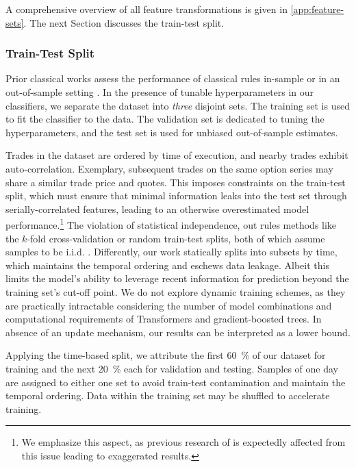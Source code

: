 A comprehensive overview of all feature transformations is given in \cref{app:feature-sets}. The next Section discusses the train-test split.

\subsubsection{Train-Test Split}\label{sec:train-test-split}

Prior classical works assess the performance of classical rules in-sample \autocite[cp.][541]{ellisAccuracyTradeClassification2000} or in an out-of-sample setting \autocites[cp.][7--9]{grauerOptionTradeClassification2022}[][3814--3815]{chakrabartyTradeClassificationAlgorithms2007}. In the presence of tunable hyperparameters in our classifiers, we separate the dataset into \emph{three} disjoint sets. The training set is used to fit the classifier to the data. The validation set is dedicated to tuning the hyperparameters, and the test set is used for unbiased out-of-sample estimates.

Trades in the dataset are ordered by time of execution, and nearby trades exhibit auto-correlation. Exemplary, subsequent trades on the same option series may share a similar trade price and quotes. This imposes constraints on the train-test split, which must ensure that minimal information leaks into the test set through serially-correlated features, leading to an otherwise overestimated model performance.\footnote{We emphasize this aspect, as previous research of \textcite[][14]{ronenMachineLearningTrade2022} is expectedly affected from this issue leading to exaggerated results.} The violation of statistical independence, out rules methods like the $k$-fold cross-validation or random train-test splits, both of which assume samples to be i.i.d. \autocite[][103--105]{lopezdepradoAdvancesFinancialMachine2018}. Differently, our work statically splits into subsets by time, which maintains the temporal ordering and eschews data leakage. Albeit this limits the model's ability to leverage recent information for prediction beyond the training set's cut-off point. We do not explore dynamic training schemes, as they are practically intractable considering the number of model combinations and computational requirements of Transformers and gradient-boosted trees. In absence of an update mechanism, our results can be interpreted as a lower bound.

Applying the time-based split, we attribute the first \SI{60}{\percent} of our dataset for training and the next \SI{20}{\percent} each for validation and testing. Samples of one day are assigned to either one set to avoid train-test contamination and maintain the temporal ordering. Data within the training set may be shuffled to accelerate training.

